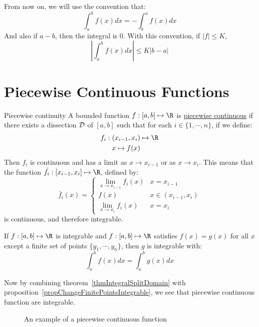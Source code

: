 \documentclass[../Main.tex]{subfiles}
\begin{document}
From now on, we will use the convention that:
\begin{equation*}
    \int_a^b f(x) dx = -\int_b^a f(x) dx
\end{equation*}
And also if $a - b$, then the integral is 0. With this convention, if $|f| \leq K$,
\begin{equation*}
    \left|\int_a^b f(x) dx\right| \leq K|b - a|
\end{equation*}
\section{Piecewise Continuous Functions}
\begin{definition}{Piecewise continuity}
    A bounded function $f : [a, b] \mapsto \R$ is \underline{piecewise continuous} if there exists a dissection $\mathcal{D}$ of $[a, b]$ such that for each $i \in \{1, \cdots, n\}$, if we define:
    \begin{align*}
        f_i : (x_{i - 1}, x_i) &\mapsto \R \\
        x \mapsto f(x)
    \end{align*}
    Then $f_i$ is continuous and has a limit as $x \to x_{i - 1}$ or as $x \to x_i$. This means that the function $\bar{f}_i : [x_{i-1}, x_i] \mapsto \R$, defined by:
    \begin{equation*}
        \bar{f}_i(x) =
        \begin{cases}
            \lim_{x \to x_{i - 1}} f_i(x) & x = x_{i - 1} \\
            f(x) & x \in (x_{i - 1}, x_i) \\
            \lim_{x \to x_i} f_i(x) & x = x_i
        \end{cases}
    \end{equation*}
    is continuous, and therefore integrable.
\end{definition}
\begin{proposition}
    If $f : [a, b] \mapsto \R$ is integrable and $f : [a, b] \mapsto \R$ satisfies $f(x) = g(x)$ for all $x$ except a finite set of points $\{y_1, \cdots, y_n\}$, then $g$ is integrable with:
    \begin{equation*}
        \int_a^b f(x) dx = \int_a^b g(x) dx
    \end{equation*}
    \label{propChangeFinitePointsIntegrable}
\end{proposition}
Now by combining theorem~\ref{thmIntegralSplitDomain} with proposition~\ref{propChangeFinitePointsIntegrable}, we see that piecewise continuous function are integrable.
\begin{figure}[ht]
    \centering
    \caption{An example of a piecewise continuous function}
    \label{figPiecewiseCTSFunc}
\end{figure}
\end{document}
